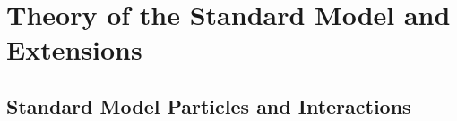 \chapter{Theory of the Standard Model and Extensions}
\label{wrBosonAndHeavyNu}
\section{Standard Model Particles and Interactions}



